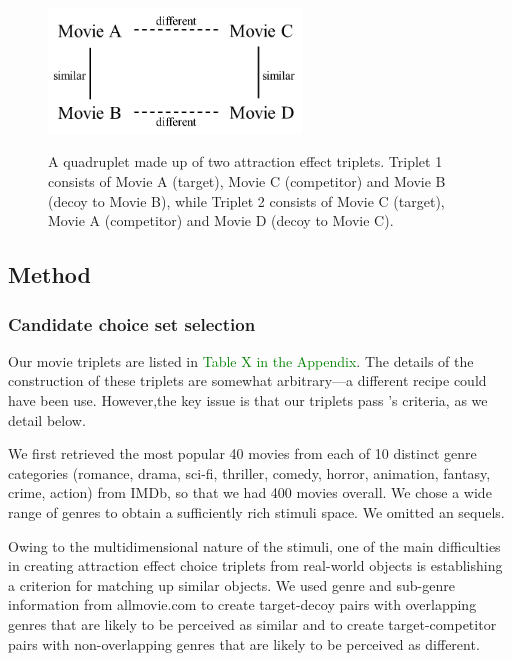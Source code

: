 \documentclass[12pt, a4paper]{article}
\newcommand{\NS}[1] {{\textcolor{green}{#1}}}
\begin{document}
 \begin{figure}
\centering
\captionsetup{justification=centering}
\caption{A quadruplet made up of two attraction effect triplets. Triplet 1 consists of Movie A (target), Movie C (competitor) and Movie B (decoy to Movie B), while Triplet 2 consists of Movie C (target), Movie A (competitor) and Movie D (decoy to Movie C).}
\includegraphics[width=0.6\textwidth]{quadruplets.png}
\label{fig:quadruplets}
\end{figure}

\subsection{Method}

\subsubsection{Candidate choice set selection}

Our movie triplets are listed in \NS{Table X in the Appendix}. The details of the construction of these triplets are somewhat arbitrary---a different recipe could have been use. However,the key issue is that our triplets pass \citeauthor{Huber2014}'s \citeyear{Huber2014} criteria, as we detail below.

We first retrieved the most popular 40 movies from each of 10 distinct genre categories (romance, drama, sci-fi, thriller, comedy, horror, animation, fantasy, crime, action) from IMDb, so that we had 400 movies overall. We chose a wide range of genres to obtain a sufficiently rich stimuli space. We omitted an sequels. 

Owing to the multidimensional nature of the stimuli, one of the main difficulties in creating attraction effect choice triplets from real-world objects is establishing a criterion for matching up similar objects. We used genre and sub-genre information from allmovie.com to create target-decoy pairs with overlapping genres that are likely to be perceived as similar and to create target-competitor pairs with non-overlapping genres that are likely to be perceived as different. 
\end{document}
